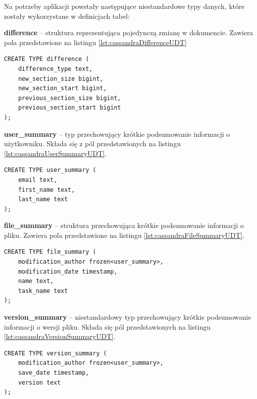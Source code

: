 Na potrzeby aplikacji powstały następujące niestandardowe typy danych, które zostały wykorzystane w definicjach tabel:
\begin{itemize}
    \begin{minipage}{\linewidth}
    \item \textbf{difference} -- struktura reprezentująca pojedynczą zmianę w dokumencie.
    Zawiera pola przedstawione na listingu \ref{lst:cassandraDifferenceUDT}
    \begin{lstlisting}[language=CQL,caption={Definicja niestandardowego typu \textit{difference}},label={lst:cassandraDifferenceUDT}]
CREATE TYPE difference (
    difference_type text,
    new_section_size bigint,
    new_section_start bigint,
    previous_section_size bigint,
    previous_section_start bigint
);
    \end{lstlisting}
    \end{minipage}
    
    \begin{minipage}{\linewidth}
    \item \textbf{user\_summary} -- typ przechowujący krótkie podsumowanie informacji o użytkowniku.
    Składa się z pól przedstawionych na listingu \ref{lst:cassandraUserSummaryUDT}.
    \begin{lstlisting}[language=CQL,caption={Definicja niestandardowego typu \textit{user\_summary}},label={lst:cassandraUserSummaryUDT}]
CREATE TYPE user_summary (
    email text,
    first_name text,
    last_name text
);
    \end{lstlisting}
    \end{minipage}
    
    \begin{minipage}{\linewidth}
    \item \textbf{file\_summary} -- struktura przechowująca krótkie podsumowanie informacji o pliku.
    Zawiera pola przedstawione na listingu \ref{lst:cassandraFileSummaryUDT}.
    \begin{lstlisting}[language=CQL,caption={Definicja niestandardowego typu \textit{file\_summary}},label={lst:cassandraFileSummaryUDT}]
CREATE TYPE file_summary (
    modification_author frozen<user_summary>,
    modification_date timestamp,
    name text,
    task_name text
);
    \end{lstlisting}
    \end{minipage}
    
    \begin{minipage}{\linewidth}
    \item \textbf{version\_summary} -- niestandardowy typ przechowujący krótkie podsumowanie informacji o wersji pliku.
    Składa się pól przedstawionych na listingu \ref{lst:cassandraVersionSummaryUDT}.
    \begin{lstlisting}[language=CQL,caption={Definicja niestandardowego typu \textit{version\_summary}},label={lst:cassandraVersionSummaryUDT}]
CREATE TYPE version_summary (
    modification_author frozen<user_summary>,
    save_date timestamp,
    version text
);
    \end{lstlisting}
    \end{minipage}
\end{itemize}

